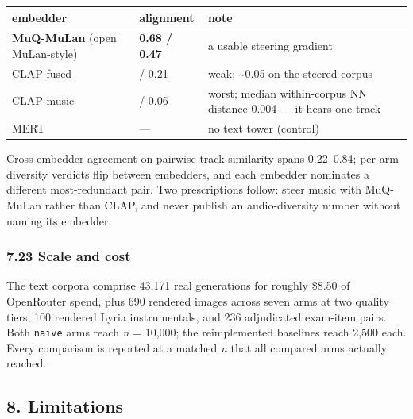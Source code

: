\documentclass[
  10pt,
]{article}
\theoremstyle{plain}
\theoremstyle{definition}
\begin{document}
{\footnotesize
\begin{longtable}[]{@{}>{\raggedright\arraybackslash}p{}>{\raggedright\arraybackslash}p{}>{\raggedright\arraybackslash}p{}@{}}
\toprule\noalign{}
embedder & alignment & note \\
\midrule\noalign{}
\endhead
\bottomrule\noalign{}
\endlastfoot
\textbf{MuQ-MuLan} (open MuLan-style) & \textbf{0.68 / 0.47} & a usable
steering gradient \\
CLAP-fused & 0.50 / 0.21 & weak; \textasciitilde0.05 on the steered
corpus \\
CLAP-music & 0.18 / 0.06 & worst; median within-corpus NN distance 0.004
--- it hears one track \\
MERT & --- & no text tower (control) \\
\end{longtable}}

Cross-embedder agreement on pairwise track similarity spans 0.22--0.84;
per-arm diversity verdicts flip between embedders, and each embedder
nominates a different most-redundant pair. Two prescriptions follow:
steer music with MuQ-MuLan rather than CLAP, and never publish an
audio-diversity number without naming its embedder.

\subsubsection{7.23 Scale and cost}\label{723-scale-and-cost}

The text corpora comprise 43,171 real generations for roughly \$8.50 of
OpenRouter spend, plus 690 rendered images across seven arms at two
quality tiers, 100 rendered Lyria instrumentals, and 236 adjudicated
exam-item pairs. Both \texttt{naive} arms reach \emph{n} = 10,000; the
reimplemented baselines reach 2,500 each. Every comparison is reported
at a matched \emph{n} that all compared arms actually reached.

\subsection{8. Limitations}\label{8-limitations}
\end{document}
